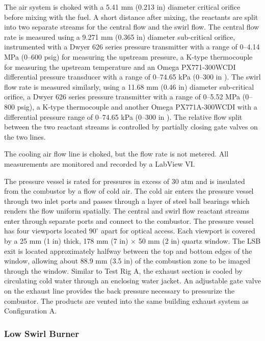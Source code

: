 The air system is choked with a 5.41 mm (0.213 in) diameter critical orifice before mixing with the fuel.
A short distance after mixing, the reactants are split into two separate streams for the central flow and the swirl flow.
The central flow rate is measured using a 9.271 mm (0.365 in) diameter sub-critical orifice, instrumented with a Dwyer 626 series pressure transmitter with a range of 0--4.14 MPa (0--600 psig) for measuring the upstream pressure, a K-type thermocouple for measuring the upstream temperature and an Omega PX771-300WCDI differential pressure transducer with a range of 0--74.65 kPa (0--300 in ).
The swirl flow rate is measured similarly, using a 11.68 mm (0.46 in) diameter sub-critical orifice, a Dwyer 626 series pressure transmitter with a range of 0--5.52 MPa (0--800 psig), a K-type thermocouple and another Omega PX771A-300WCDI with a differential pressure range of 0--74.65 kPa (0--300 in ).
The relative flow split between the two reactant streams is controlled by partially closing gate valves on the two lines.

The cooling air flow line is choked, but the flow rate is not metered.
All measurements are monitored and recorded by a LabView VI.

The pressure vessel is rated for pressures in excess of 30 atm and is insulated from the combustor by a flow of cold air.
The cold air enters the pressure vessel through two inlet ports and passes through a layer of steel ball bearings which renders the flow uniform spatially.
The central and swirl flow reactant streams enter through separate ports and connect to the combustor.
The pressure vessel has four viewports located \(90^\circ\) apart for optical access.
Each viewport is covered by a 25 mm (1 in) thick, 178 mm (7 in) \(\times\) 50 mm (2 in) quartz window.
The LSB exit is located approximately halfway between the top and bottom edges of the window, allowing about 88.9 mm (3.5 in) of the combustion zone to be imaged through the window.
Similar to Test Rig A, the exhaust section is cooled by circulating cold water through an enclosing water jacket.
An adjustable gate valve on the exhaust line provides the back pressure necessary to pressurize the combustor.
The products are vented into the same building exhaust system as Configuration A.

\subsubsection{Low Swirl Burner}
\label{subsubsec:configuration-b-low-swirl-burner}

